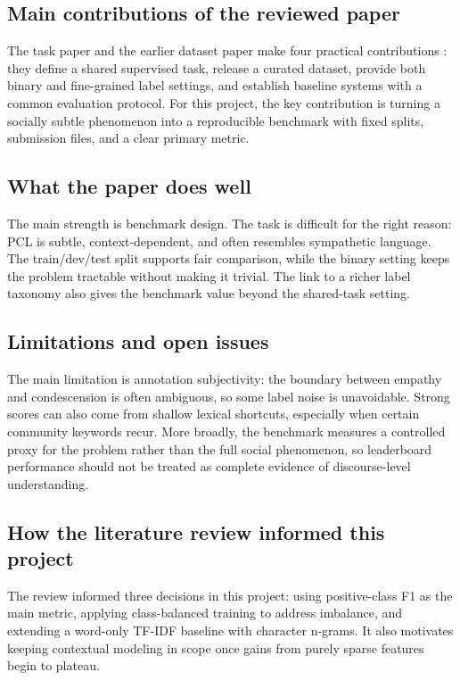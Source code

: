 \documentclass[11pt]{article}
\begin{document}
    \subsection{Main contributions of the reviewed paper}
    The task paper and the earlier dataset paper make four practical
    contributions \cite{semeval2022,baseline}: they define a shared supervised
    task, release a curated dataset, provide both binary and fine-grained label
    settings, and establish baseline systems with a common evaluation protocol.
    For this project, the key contribution is turning a socially subtle
    phenomenon into a reproducible benchmark with fixed splits, submission
    files, and a clear primary metric.

    \subsection{What the paper does well}
    The main strength is benchmark design. The task is difficult for the right
    reason: PCL is subtle, context-dependent, and often resembles sympathetic
    language. The train/dev/test split supports fair comparison, while the
    binary setting keeps the problem tractable without making it trivial. The
    link to a richer label taxonomy also gives the benchmark value beyond the
    shared-task setting.

    \subsection{Limitations and open issues}
    The main limitation is annotation subjectivity: the boundary between empathy
    and condescension is often ambiguous, so some label noise is unavoidable.
    Strong scores can also come from shallow lexical shortcuts, especially when
    certain community keywords recur. More broadly, the benchmark measures a
    controlled proxy for the problem rather than the full social phenomenon, so
    leaderboard performance should not be treated as complete evidence of
    discourse-level understanding.

    \subsection{How the literature review informed this project}
    The review informed three decisions in this project: using positive-class
    F1 as the main metric, applying class-balanced training to address
    imbalance, and extending a word-only TF-IDF baseline with character
    n-grams. It also motivates keeping contextual modeling in scope once gains
    from purely sparse features begin to plateau.
\end{document}
